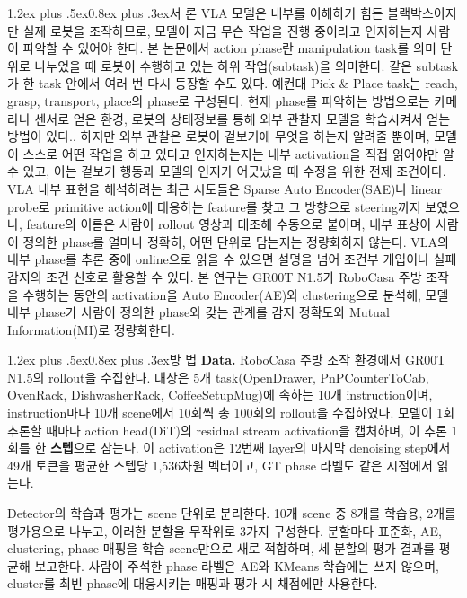 \documentclass[a4paper,twocolumn,9pt]{extarticle}
\makeatletter
\renewcommand\section{\@startsection{section}{1}{\z@}%
  {1.2ex plus .5ex}{0.8ex plus .3ex}{\normalsize\bfseries}}
\makeatother
\begin{document}
\section{서 론}
VLA 모델은 내부를 이해하기 힘든 블랙박스이지만 실제 로봇을 조작하므로, 모델이 지금 무슨 작업을 진행 중이라고 인지하는지 사람이 파악할 수 있어야 한다. 본 논문에서 action phase란 manipulation task를 의미 단위로 나누었을 때 로봇이 수행하고 있는 하위 작업(subtask)을 의미한다. 같은 subtask가 한 task 안에서 여러 번 다시 등장할 수도 있다. 예컨대 Pick \& Place task는 reach, grasp, transport, place의 phase로 구성된다\cite{options}. 현재 phase를 파악하는 방법으로는 카메라나 센서로 얻은 환경, 로봇의 상태정보를 통해 외부 관찰자 모델을 학습시켜서 얻는 방법이 있다.\cite{lotus}. 하지만 외부 관찰은 로봇이 겉보기에 무엇을 하는지 알려줄 뿐이며, 모델이 스스로 어떤 작업을 하고 있다고 인지하는지는 내부 activation을 직접 읽어야만 알 수 있고, 이는 겉보기 행동과 모델의 인지가 어긋났을 때 수정을 위한 전제 조건이다. VLA 내부 표현을 해석하려는 최근 시도들은 Sparse Auto Encoder(SAE)나 linear probe로 primitive action에 대응하는 feature를 찾고 그 방향으로 steering까지 보였으나\cite{saevla,egsae,observing,mechinterp}, feature의 이름은 사람이 rollout 영상과 대조해 수동으로 붙이며, 내부 표상이 사람이 정의한 phase를 얼마나 정확히, 어떤 단위로 담는지는 정량화하지 않는다. VLA의 내부 phase를 추론 중에 online으로 읽을 수 있으면 설명을 넘어 조건부 개입이나 실패 감지\cite{safe}의 조건 신호로 활용할 수 있다. 본 연구는 GR00T N1.5\cite{groot}가 RoboCasa\cite{robocasa} 주방 조작을 수행하는 동안의 activation을 Auto Encoder(AE)와 clustering으로 분석해, 모델 내부 phase가 사람이 정의한 phase와 갖는 관계를 감지 정확도와 Mutual Information(MI)로 정량화한다. 

\section{방 법}
\textbf{Data.} RoboCasa 주방 조작 환경에서 GR00T N1.5의 rollout을 수집한다. 대상은 5개 task(OpenDrawer, PnPCounterToCab, OvenRack, DishwasherRack, CoffeeSetupMug)에 속하는 10개 instruction이며, instruction마다 10개 scene에서 10회씩 총 100회의 rollout을 수집하였다. 모델이 1회 추론할 때마다 action head(DiT)의 residual stream activation을 캡처하며, 이 추론 1회를 한 \textbf{스텝}으로 삼는다. 이 activation은 12번째 layer의 마지막 denoising step에서 49개 토큰을 평균한 스텝당 1{,}536차원 벡터이고, GT phase 라벨도 같은 시점에서 읽는다.

Detector의 학습과 평가는 scene 단위로 분리한다. 10개 scene 중 8개를 학습용, 2개를 평가용으로 나누고, 이러한 분할을 무작위로 3가지 구성한다. 분할마다 표준화, AE, clustering, phase 매핑을 학습 scene만으로 새로 적합하며, 세 분할의 평가 결과를 평균해 보고한다.  사람이 주석한 phase 라벨은 AE와 KMeans 학습에는 쓰지 않으며, cluster를 최빈 phase에 대응시키는 매핑과 평가 시 채점에만 사용한다.
\end{document}
